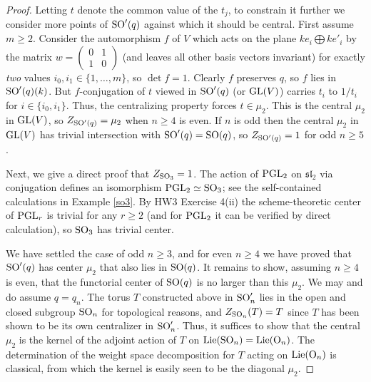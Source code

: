 \documentclass[10pt]{article}
\renewcommand{\(}{\left(}
\renewcommand{\)}{\right)}
\numberwithin{thm}{subsection}
\begin{document}
\begin{proof}
Letting $t$ denote the common value of the $t_j$, to constrain it further we 
consider more points of ${\rm{SO}}'(q)$ against which it should be central.
First assume $m \ge 2$.  
Consider the automorphism $f$ of $V$ which  acts on the plane
$ke_i \bigoplus k e'_i$ by the matrix
$w = \left(\begin{smallmatrix} 0 & 1 \\ 1 & 0 \end{smallmatrix}\right)$
(and leaves all other basis vectors invariant) for
exactly {\em two} values $i_0, i_1 \in \{1, \dots, m\}$, so
$\det f = 1$.  
Clearly $f$ preserves $q$, so $f$ lies in
${\rm{SO}}'(q)(k)$.  But $f$-conjugation of $t$ viewed in
${\rm{SO}}'(q)$ (or ${\rm{GL}}(V)$) carries $t_i$ to $1/t_i$ for
$i \in \{i_0, i_1\}$.  Thus,  the centralizing property
forces $t \in \mu_2$.   This is the central $\mu_2$
in ${\rm{GL}}(V)$, so $Z_{{\rm{SO}}'(q)} = \mu_2$ when $n \ge 4$ is even.  
If $n$ is odd then the central $\mu_2$ in ${\rm{GL}}(V)$
has trivial intersection with ${\rm{SO}}'(q) = {\rm{SO}}(q)$, so $Z_{{\rm{SO}}'(q)} = 1$
for odd $n \ge 5$.  

Next, we give a direct proof that 
$Z_{{\rm{SO}}_3} = 1$.   The action 
of ${\rm{PGL}}_2$ on $\mathfrak{sl}_2$ via conjugation 
defines an isomorphism 
${\rm{PGL}}_2 \simeq {\rm{SO}}_3$; see
the self-contained calculations in Example \ref{so3}.
By HW3 Exercise 4(ii)  the scheme-theoretic
center of ${\rm{PGL}}_r$ is trivial for any $r \ge 2$
(and for ${\rm{PGL}}_2$ it can be verified by direct calculation), so ${\rm{SO}}_3$
has trivial center.

We have settled the case of odd $n \ge 3$, and for even $n \ge 4$ we have proved
that ${\rm{SO}}'(q)$ has center $\mu_2$ that also lies in ${\rm{SO}}(q)$.    It remains to show,
assuming $n \ge 4$ is even, 
that the functorial center of ${\rm{SO}}(q)$ is no larger than this $\mu_2$.
We may and do assume $q = q_n$.
The torus $T$ constructed above in ${\rm{SO}}'_n$ 
lies in the open and closed subgroup ${\rm{SO}}_n$
for topological reasons, and $Z_{{\rm{SO}}_n}(T) = T$
since $T$ has been shown to be its own centralizer in ${\rm{SO}}'_n$.
Thus, it suffices to show that the central $\mu_2$ is the kernel
of the adjoint action of $T$ on ${\rm{Lie}}({\rm{SO}}_n) = {\rm{Lie}}({\rm{O}}_n)$.
The determination of the weight space decomposition for $T$ acting on 
${\rm{Lie}}({\rm{O}}_n)$ is classical, from which the kernel is easily seen to be
the diagonal $\mu_2$.
\end{proof}
\end{document}
